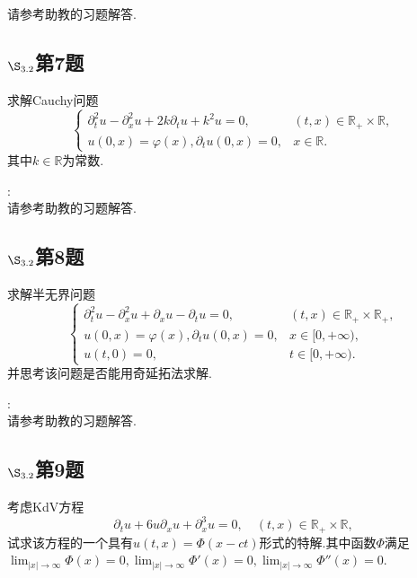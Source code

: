 \documentclass[12pt, a4paper]{ctexbook}
\begin{document}
    请参考助教的习题解答.
    
    
    
    \subsection{$\S_{3.2}$第7题}
    \kaishu{}
    
    求解Cauchy问题
    $$\begin{cases}
    \partial_t^2 u - \partial_x^2u + 2k\partial_t u + k^2 u = 0 , & (t,x)\in \mathbb R_+\times \mathbb R,\\
    u(0, x) = \varphi(x), \partial_t u(0, x) = 0, & x \in \mathbb R.
    \end{cases}$$
    其中$k\in \mathbb R$为常数.
    
    \songti{}:\\
    
    请参考助教的习题解答.
    
    
    
    \subsection{$\S_{3.2}$第8题}
    \kaishu{}
    
    求解半无界问题
    $$\begin{cases}
    \partial_t^2 u - \partial_x^2u + \partial_x u - \partial_t u = 0, & (t,x)\in \mathbb R_+\times \mathbb R_+,\\
    u(0, x) = \varphi(x), \partial_t u(0, x) = 0, & x \in [0, +\infty),\\
    u(t, 0) = 0, & t \in [0, +\infty).
    \end{cases}$$
    并思考该问题是否能用奇延拓法求解.
    
    \songti{}:\\
    
    请参考助教的习题解答.
    
    
    
    \subsection{$\S_{3.2}$第9题}
    \kaishu{}
    
    考虑KdV方程
    $$\partial_t u + 6u \partial_x u + \partial_x^3 u = 0, \quad (t,x)\in \mathbb R_+\times \mathbb R,$$
    试求该方程的一个具有$u(t, x) = \Phi(x-ct)$形式的特解.其中函数$\Phi$满足
    $\lim_{|x|\rightarrow \infty}\Phi(x) = 0, \lim_{|x|\rightarrow \infty}\Phi'(x) = 0, \lim_{|x|\rightarrow \infty}\Phi''(x) = 0.$
    
\end{document}
